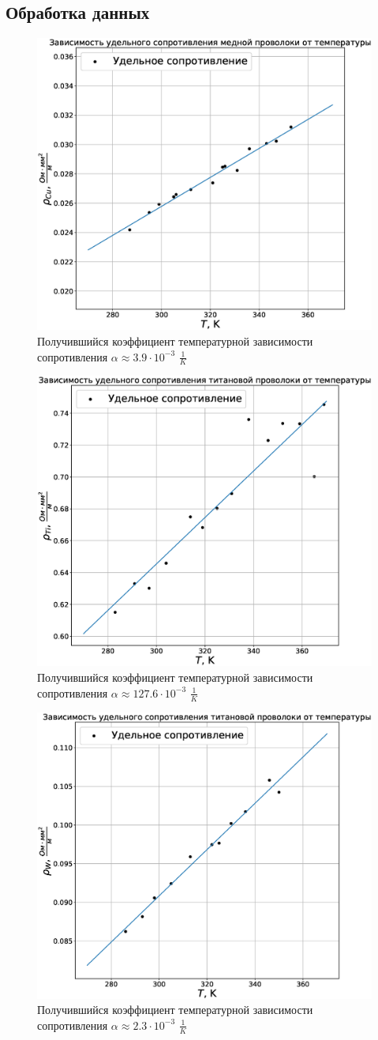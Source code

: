 \documentclass[a4paper,14pt]{extarticle}
\begin{document}
		\subsection{Обработка данных}
			\begin{figure}[h!]
				\centering
				\includegraphics[width=.60\linewidth]{Lab3_2.eps}
				\caption{Получившийся коэффициент температурной зависимости сопротивления $\alpha \approx 3.9 \cdot 10^{-3}$ $\frac{1}{K}$ }
				\label{fig2}
			\end{figure}
		\newpage
			\begin{figure}[h!]
				\centering
				\includegraphics[width=.55\linewidth]{Lab3_3.eps}
				\caption{Получившийся коэффициент температурной зависимости сопротивления $\alpha \approx 127.6 \cdot 10^{-3}$ $\frac{1}{K}$}
				\label{fig3}
			\end{figure}
			\begin{figure}[h!]
				\centering
				\includegraphics[width=.60\linewidth]{Lab3_4.eps}
				\caption{Получившийся коэффициент температурной зависимости сопротивления $\alpha \approx 2.3 \cdot 10^{-3}$ $\frac{1}{K}$}
				\label{fig4}
			\end{figure}
\end{document}
